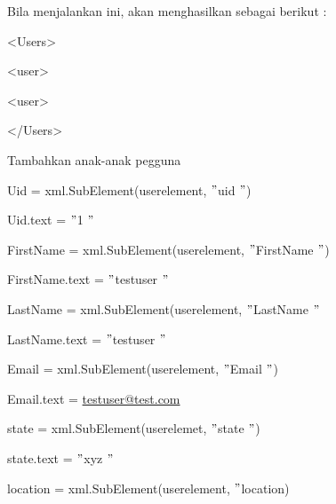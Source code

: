 \documentclass{wileySix}
\begin{document}
\begin{myEnumerate}
\begin{myEnumerate}
{\noindent 
Bila menjalankan ini, akan menghasilkan sebagai berikut : \par
\noindent 
{\fontsize{10pt}{10pt}\selectfont <Users>} \par
\noindent 
{\fontsize{10pt}{10pt}\selectfont  \hspace*{0.5in} <user>} \par
\noindent 
{\fontsize{10pt}{10pt}\selectfont  \hspace*{0.5in} <user>} \par
\noindent 
{\fontsize{10pt}{10pt}\selectfont </Users>} \par
\vspace{10pt}
\vspace{10pt}
\vspace{10pt}
\noindent 
Tambahkan anak-anak pegguna \par
\vspace{10pt}
\noindent 
{\fontsize{10pt}{10pt}\selectfont Uid = xml.SubElement(userelement,  $ " $uid $ " $)} \par
\noindent 
{\fontsize{10pt}{10pt}\selectfont Uid.text =  $ " $1 $ " $} \par
\vspace{10pt}
\noindent 
{\fontsize{10pt}{10pt}\selectfont FirstName = xml.SubElement(userelement,  $ " $FirstName $ " $)} \par
\noindent 
{\fontsize{10pt}{10pt}\selectfont FirstName.text =  $ " $testuser $ " $} \par
\vspace{10pt}
\noindent 
{\fontsize{10pt}{10pt}\selectfont LastName = xml.SubElement(userelement,  $ " $LastName $ " $} \par
\noindent 
{\fontsize{10pt}{10pt}\selectfont LastName.text =  $ " $testuser $ " $} \par
\vspace{10pt}
\noindent 
{\fontsize{10pt}{10pt}\selectfont Email = xml.SubElement(userelement,  $ " $Email $ " $)} \par
\noindent 
{\fontsize{10pt}{10pt}\selectfont Email.text = \href{mailto:testuser@test.com}{testuser@test.com}
} \par
\vspace{10pt}
\noindent 
{\fontsize{10pt}{10pt}\selectfont state = xml.SubElement(userelemet,  $ " $state $ " $)} \par
\noindent 
{\fontsize{10pt}{10pt}\selectfont state.text =  $ " $xyz $ " $} \par
\vspace{10pt}
\noindent 
{\fontsize{10pt}{10pt}\selectfont location = xml.SubElement(userelement,  $ " $location)} \par
}
\end{myEnumerate}
\end{myEnumerate}
\end{document}

